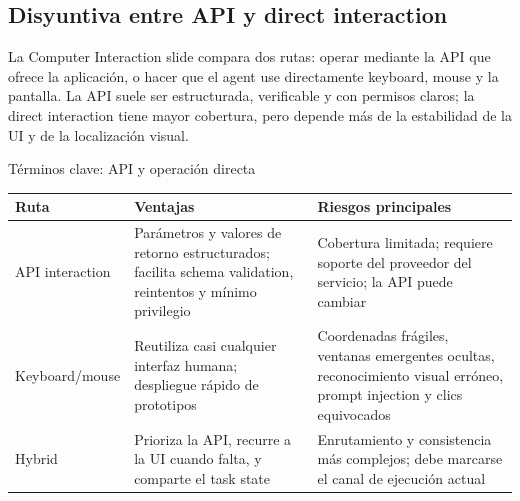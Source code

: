 
\subsection{Disyuntiva entre API y direct interaction}

La Computer Interaction slide compara dos rutas: operar mediante la API que ofrece la aplicación, o hacer que el agent use directamente keyboard, mouse y la pantalla. La API suele ser estructurada, verificable y con permisos claros; la direct interaction tiene mayor cobertura, pero depende más de la estabilidad de la UI y de la localización visual.


\begin{knowledgebox}{Términos clave: API y operación directa}
\begin{tabularx}{\textwidth}{L{0.18\textwidth}X X}
\toprule
Ruta & Ventajas & Riesgos principales \\
\midrule
API interaction & Parámetros y valores de retorno estructurados; facilita schema validation, reintentos y mínimo privilegio & Cobertura limitada; requiere soporte del proveedor del servicio; la API puede cambiar \\
Keyboard/mouse & Reutiliza casi cualquier interfaz humana; despliegue rápido de prototipos & Coordenadas frágiles, ventanas emergentes ocultas, reconocimiento visual erróneo, prompt injection y clics equivocados \\
Hybrid & Prioriza la API, recurre a la UI cuando falta, y comparte el task state & Enrutamiento y consistencia más complejos; debe marcarse el canal de ejecución actual \\
\bottomrule
\end{tabularx}
\end{knowledgebox}


